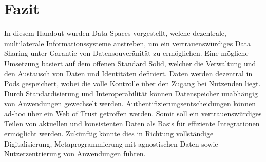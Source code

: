 
\section{Fazit}

In diesem Handout wurden Data Spaces vorgestellt, welche dezentrale, multilaterale Informationssysteme anstreben, um ein vertrauenswürdiges Data Sharing unter Garantie von Datensouveränität zu ermöglichen.
Eine mögliche Umsetzung basiert auf dem offenen Standard Solid, welcher die Verwaltung und den Austausch von Daten und Identitäten definiert.
Daten werden dezentral in Pods gespeichert, wobei die volle Kontrolle über den Zugang bei Nutzenden liegt.
Durch Standardisierung und Interoperabilität können Datenspeicher unabhängig von Anwendungen gewechselt werden.
Authentifizierungsentscheidungen können ad-hoc über ein Web of Trust getroffen werden.
Somit soll ein vertrauenswürdiges Teilen von aktuellen und konsistenten Daten als Basis für effiziente Integrationen ermöglicht werden.
Zukünftig könnte dies in Richtung vollständige Digitalisierung, Metaprogrammierung mit agnostischen Daten sowie Nutzerzentrierung von Anwendungen führen.
